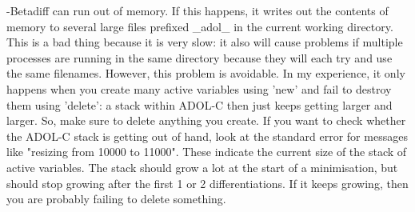 -Betadiff can run out of memory. If this happens, it writes out the contents of memory to several large files prefixed \_adol\_ in the current working directory. This is a bad thing because it is very slow: it also will cause problems if multiple processes are running in the same directory because they will each try and use the same filenames. However, this problem is avoidable. In my experience, it only happens when you create many active variables using 'new' and fail to destroy them using 'delete': a stack within ADOL-C then just keeps getting larger and larger. So, make sure to delete anything you create. If you want to check whether the ADOL-C stack is getting out of hand, look at the standard error for messages like "resizing from 10000 to 11000". These indicate the current size of the stack of active variables. The stack should grow a lot at the start of a minimisation, but should stop growing after the first 1 or 2 differentiations. If it keeps growing, then you are probably failing to delete something.




